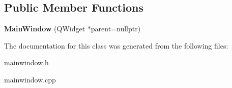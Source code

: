 \subsection*{Public Member Functions}
\begin{DoxyCompactItemize}
\item 
\mbox{\label{classMainWindow_a996c5a2b6f77944776856f08ec30858d}} 
{\bfseries Main\+Window} (Q\+Widget $\ast$parent=nullptr)
\end{DoxyCompactItemize}


The documentation for this class was generated from the following files\+:\begin{DoxyCompactItemize}
\item 
mainwindow.\+h\item 
mainwindow.\+cpp\end{DoxyCompactItemize}
